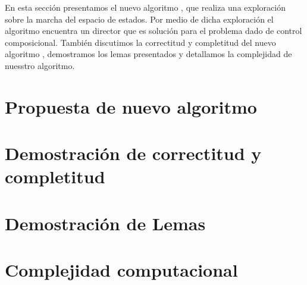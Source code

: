 
En esta sección presentamos el nuevo algoritmo \DCS, que realiza una exploración sobre la marcha del espacio de estados. Por medio de dicha exploración el algoritmo encuentra un director que es solución para el problema dado de control composicional. También discutimos la correctitud y completitud del nuevo algoritmo \DCS, demostramos los lemas presentados y detallamos la complejidad de nuesstro algoritmo. \\

\section{Propuesta de nuevo algoritmo}



\FloatBarrier

\section{Demostración de correctitud y completitud}


\section{Demostración de Lemas}


\section{Complejidad computacional}



